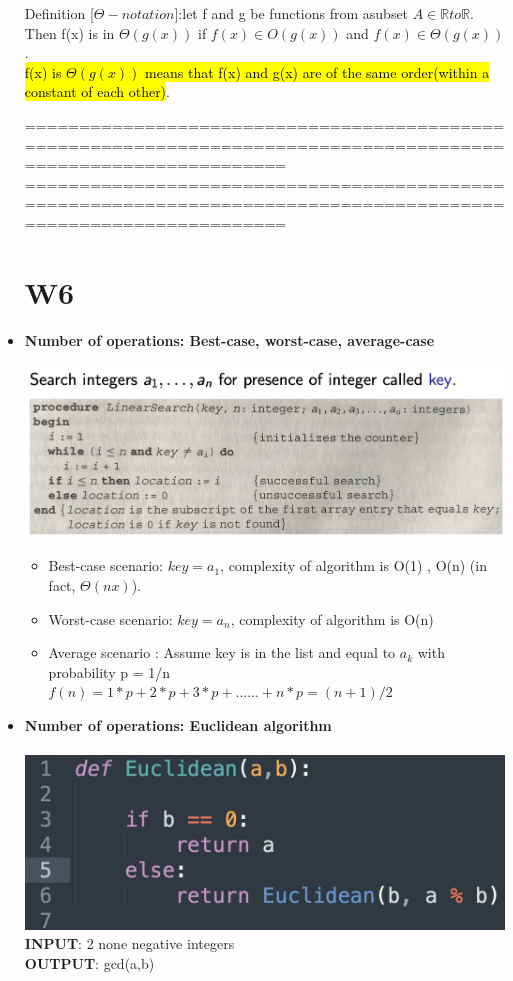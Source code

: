 \documentclass{article}
\begin{document}
\begin{itemize}
Definition [$\Theta -notation$]:let f and g be functions from asubset $A \in \mathbb{R} to \mathbb{R}$. Then f(x) is in $\Theta(g(x))$ if $f(x) \in O(g(x))$ and $f(x) \in \Theta(g(x))$.\\
\hl{f(x) is $\Theta(g(x))$ means that f(x) and g(x) are of the same order(within a constant of each other)}.


================================================================================================================
\newpage
================================================================================================================
\section{W6}

\item \textbf{Number of operations: Best-case, worst-case, average-case}\\\\
  \includegraphics[width=1.0\linewidth]{graph/5.jpg} %
  
\begin{itemize}
\item Best-case scenario: $key = a_1$, complexity of algorithm is O(1) ,  O(n) (in fact, $\Theta(nx)$).
\item Worst-case scenario: $key =  a_n$, complexity of algorithm is O(n)
\item Average scenario : Assume key is in the list and equal to $a_k$ with probability p = 1/n\\
$f(n) = 1*p + 2*p + 3*p +......+ n*p = (n + 1)/2$
\end{itemize}
  
 \item \textbf{Number of operations: Euclidean algorithm}\\\\
  \includegraphics[width=1.0\linewidth]{graph/6.jpg} \\%
  \textbf{INPUT}: 2 none negative integers\\
  \textbf{OUTPUT}: gcd(a,b)\\
  

\end{itemize}
\end{document}
